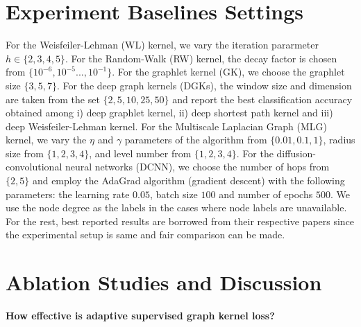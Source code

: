 \documentclass{article}
\begin{document}
\section{Experiment Baselines Settings }

For the Weisfeiler-Lehman (WL) kernel, we vary the iteration pararmeter $h\in\{2, 3, 4, 5\}$. For the Random-Walk (RW) kernel, the decay factor is chosen from $\{10^{-6},10^{-5}...,10^{-1}\}$. For the graphlet kernel (GK), we choose the graphlet  size $\{3,5,7\}$.  For the deep graph kernels (DGKs),  the  window size and dimension are taken from the set $\{2,5,10,25,50\}$ and report the best classification accuracy obtained among i) deep graphlet kernel, ii) deep shortest path kernel and iii) deep Weisfeiler-Lehman kernel. For the Multiscale Laplacian Graph (MLG) kernel, we vary the $\eta$ and $\gamma$ parameters of the algorithm from $\{0.01,0.1,1\}$, radius size from $\{1,2,3,4\}$, and level number from $\{1,2,3,4\}$. For  the diffusion-convolutional neural networks (DCNN), we choose the number of hops from $\{2,5\}$ and employ the AdaGrad algorithm (gradient descent) with the following parameters: the learning rate $0.05$, batch size $100$ and number of  epochs $500$. We use the node degree   as the labels  in the cases where node labels are unavailable.  For the rest, best reported results are borrowed from their respective papers since the experimental  setup is same and fair comparison can be made.



\section{Ablation Studies and Discussion}\label{sec:ablation_study}

\noindent \textbf{How   effective is adaptive supervised graph kernel loss?} 
\end{document}
